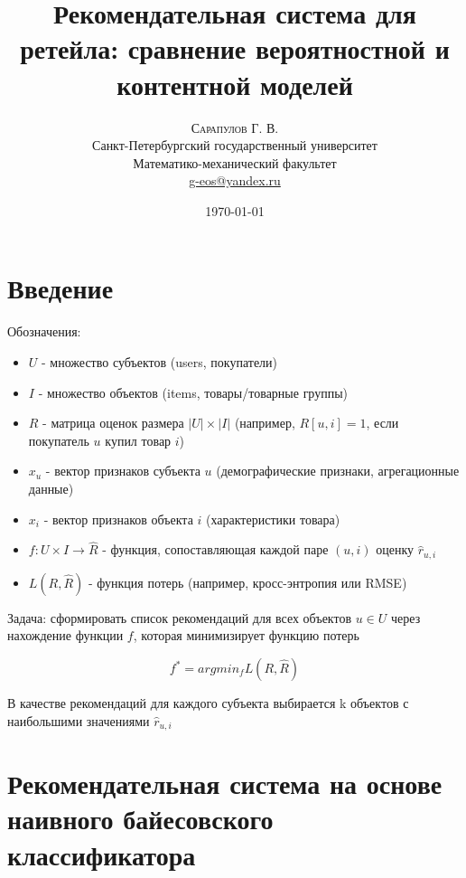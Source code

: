 \documentclass{article}
\title{Рекомендательная система для ретейла: сравнение вероятностной и контентной моделей} %
\author{%
\textsc{Сарапулов Г. В.} \\ %
\normalsize Санкт-Петербургский государственный университет \\ %
\normalsize Математико-механический факультет \\ %
\normalsize \href{mailto:john@smith.com}{g-eos@yandex.ru} %
}
\date{\today} %
\begin{document}
\maketitle


\section{Введение}


Обозначения:

\begin{itemize}
\item $U$ - множество субъектов (users, покупатели)
\item $I$ - множество объектов (items, товары/товарные группы)
\item $R$ - матрица оценок размера $|U| \times |I|$ (например, $R[u, i] = 1$, если покупатель $u$ купил товар $i$)
\item $x_u$ - вектор признаков субъекта $u$ (демографические признаки, агрегационные данные)
\item $x_i$ - вектор признаков объекта $i$ (характеристики товара)
\item $f: U \times I \rightarrow \hat R$ - функция, сопоставляющая каждой паре $(u, i)$ оценку $\hat r_{u,i}$
\item $L(R, \hat R)$ - функция потерь (например, кросс-энтропия или RMSE)
 \end{itemize}
 
Задача: сформировать список рекомендаций для всех объектов $u \in U$ через нахождение функции $f$, которая минимизирует функцию потерь

\begin{equation}
\label{eq:foo}
f^* = argmin_f  L(R, \hat R)
\end{equation}

В качестве рекомендаций для каждого субъекта выбирается k объектов с наибольшими значениями $\hat r_{u,i}$


\section{Рекомендательная система на основе наивного байесовского классификатора}
\end{document}
